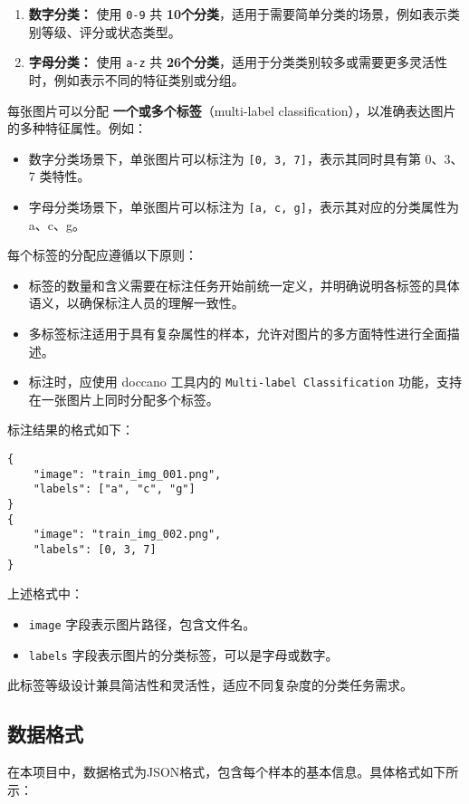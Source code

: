 \begin{enumerate}
    \item \textbf{数字分类：} 使用 \texttt{0-9} 共 \textbf{10个分类}，适用于需要简单分类的场景，例如表示类别等级、评分或状态类型。
    \item \textbf{字母分类：} 使用 \texttt{a-z} 共 \textbf{26个分类}，适用于分类类别较多或需要更多灵活性时，例如表示不同的特征类别或分组。
\end{enumerate}

\noindent 每张图片可以分配 \textbf{一个或多个标签}（multi-label classification），以准确表达图片的多种特征属性。例如：
\begin{itemize}
    \item 数字分类场景下，单张图片可以标注为 \texttt{[0, 3, 7]}，表示其同时具有第 0、3、7 类特性。
    \item 字母分类场景下，单张图片可以标注为 \texttt{[a, c, g]}，表示其对应的分类属性为 a、c、g。
\end{itemize}

\noindent 每个标签的分配应遵循以下原则：
\begin{itemize}
    \item 标签的数量和含义需要在标注任务开始前统一定义，并明确说明各标签的具体语义，以确保标注人员的理解一致性。
    \item 多标签标注适用于具有复杂属性的样本，允许对图片的多方面特性进行全面描述。
    \item 标注时，应使用 doccano 工具内的 \texttt{Multi-label Classification} 功能，支持在一张图片上同时分配多个标签。
\end{itemize}

\noindent 标注结果的格式如下：
\begin{lstlisting}
{
    "image": "train_img_001.png",
    "labels": ["a", "c", "g"]
}
{
    "image": "train_img_002.png",
    "labels": [0, 3, 7]
}
\end{lstlisting}

上述格式中：
\begin{itemize}
    \item \texttt{image} 字段表示图片路径，包含文件名。
    \item \texttt{labels} 字段表示图片的分类标签，可以是字母或数字。
\end{itemize}

此标签等级设计兼具简洁性和灵活性，适应不同复杂度的分类任务需求。

\subsection{数据格式}
在本项目中，数据格式为JSON格式，包含每个样本的基本信息。具体格式如下所示：

